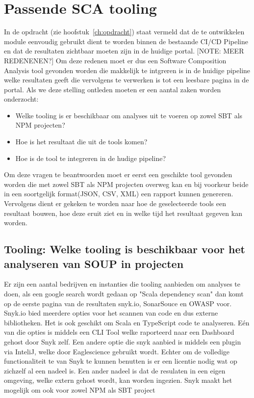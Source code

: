\section{Passende SCA tooling}\label{sec:sca-tooling}

In de opdracht (zie hoofstuk~\ref{ch:opdracht}) staat vermeld dat de te ontwikkelen module eenvoudig gebruikt dient te worden binnen de bestaande CI/CD Pipeline en dat de resultaten zichtbaar moeten zijn in de huidige portal. [NOTE: MEER REDENENEN?] Om deze redenen moet er dus een Software Composition Analysis tool gevonden worden die makkelijk te intgreren is in de huidige pipeline welke resultaten geeft die vervolgens te verwerken is tot een leesbare pagina in de portal. Als we deze stelling ontleden moeten er een aantal zaken worden onderzocht:
\begin{itemize}
    \item Welke tooling is er beschikbaar om analyses uit te voeren op zowel SBT als NPM projecten?
    \item Hoe is het resultaat die uit de tools komen?
    \item Hoe is de tool te integreren in de hudige pipeline?
\end{itemize}
Om deze vragen te beantwoorden moet er eerst een geschikte tool gevonden worden die met zowel SBT als NPM projecten overweg kan en bij voorkeur beide in een soortgelijk format(JSON, CSV, XML) een rapport kunnen genereren. Vervolgens dient er gekeken te worden naar hoe de geselecteerde tools een resultaat bouwen, hoe deze eruit ziet en in welke tijd het resultaat gegeven kan worden.

\subsection{Tooling: Welke tooling is beschikbaar voor het analyseren van SOUP in projecten}\label{subsec:ESTooling}
Er zijn een aantal bedrijven en instanties die tooling aanbieden om analyses te doen, als een google search wordt gedaan op "Scala dependency scan" dan komt op de eerste pagina van de resultaten snyk.io, SonarSouce en OWASP voor. Snyk.io bied meerdere opties voor het scannen van code en dus externe bibliotheken. Het is ook geschikt om Scala en TypeScript code te analyseren. Eén van die opties is middels een CLI Tool welke raporteerd naar een Dashboard gehost door Snyk zelf. Een andere optie die snyk aanbied is middels een plugin via InteliJ, welke door Eaglescience gebruikt wordt. Echter om de volledige functionaliteit te van Snyk te kunnen benutten is er een licentie nodig wat op zichzelf al een nadeel is. Een ander nadeel is dat de resulaten in een eigen omgeving, welke extern gehost wordt, kan worden ingezien. Snyk maakt het mogelijk om ook voor zowel NPM als SBT project

